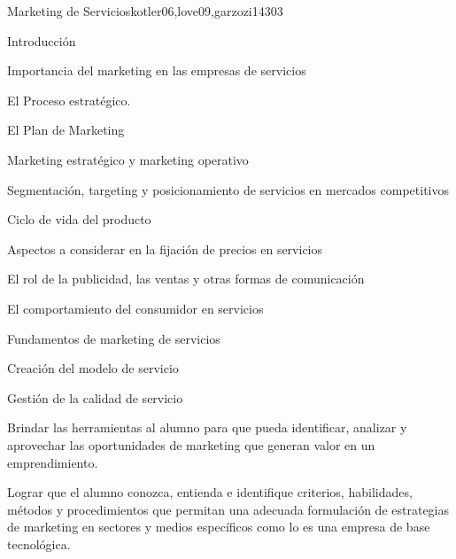 \begin{syllabus}
\begin{unit}{Marketing de Servicios}{}{kotler06,love09,garzozi14}{30}{3}
\begin{topics}
      \item Introducción
      \item Importancia del marketing en las empresas de servicios
      \item El Proceso estratégico.
      \item El Plan de Marketing
      \item Marketing estratégico y marketing operativo
      \item Segmentación, targeting y posicionamiento de servicios en mercados competitivos
      \item Ciclo de vida del producto
       \item Aspectos a considerar en la fijación de precios en servicios
       \item El rol de la publicidad, las ventas y otras formas de comunicación
      \item El comportamiento del consumidor en servicios
      \item Fundamentos de marketing de servicios
      \item Creación del modelo de servicio
      \item Gestión de la calidad de servicio
   \end{topics}
   \begin{learningoutcomes}
      \item Brindar las herramientas al alumno para que pueda identificar, analizar y aprovechar las oportunidades de marketing que generan valor en un emprendimiento.
      \item Lograr que el alumno conozca, entienda e identifique criterios, habilidades, métodos y procedimientos que permitan una adecuada formulación de estrategias de marketing en sectores y medios específicos como lo es una empresa de base tecnológica.
   \end{learningoutcomes}
\end{unit}


\end{syllabus}
